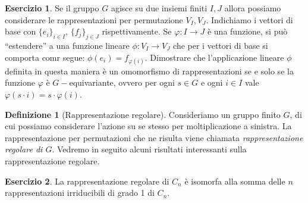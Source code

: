 \documentclass[11pt]{article}
\theoremstyle{plain}
\theoremstyle{definition}
\newtheorem{defn}{Definizione}[section]
\newtheorem{exercise}{Esercizio}[section]
\theoremstyle{remark}
\begin{document}
\begin{exercise}
\label{ex:equivariante}
Se il gruppo $G$ agisce su due insiemi finiti $I,J$ allora possiamo considerare le rappresentazioni per permutazione $V_I, V_J$.
Indichiamo i vettori di base con $\{e_i\}_{i\in I}$, $\{f_j\}_{j\in J}$ rispettivamente.
Se $\varphi:I\to J$ è una funzione, si può ``estendere'' a una funzione lineare $\phi:V_I\to V_J$ che per i vettori di base si comporta comr segue: 
$\phi(e_i) = f_{\varphi(i)}$.
Dimostrare che l'applicazione lineare $\phi$ definita in questa maniera è un omomorfismo di rappresentazioni se e solo se la funzione 
$\varphi$ è $G-$equivariante, ovvero per ogni $s\in G$ e ogni $i\in I$ vale $\varphi(s\cdot i) = s\cdot\varphi(i)$.
\end{exercise}

\begin{defn}[Rappresentazione regolare]
  Consideriamo un gruppo finito $G$, di cui possiamo considerare l'azione su se stesso per moltiplicazione a sinistra.
  La rappresentazione per permutazioni che ne risulta viene chiamata \emph{rappresentazione regolare di $G$}.
  Vedremo in seguito alcuni risultati interessanti sulla rappresentazione regolare.
  \label{defn:rappresentazione regolare}
\end{defn}

\begin{exercise}
La rappresentazione regolare di $C_n$ è isomorfa alla somma delle $n$ rappresentazioni irriducibili di grado 1 di $C_n$.
\end{exercise}
\end{document}
